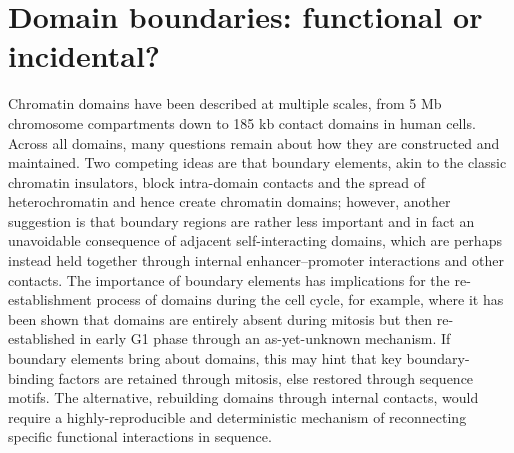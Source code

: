 \documentclass[a4paper,11pt,oneside]{book}
\begin{document}


\section{Domain boundaries: functional or incidental?}


Chromatin domains have been described at multiple scales, from 5 Mb chromosome compartments\cite{Lieberman2009} down to 185 kb contact domains\cite{Rao2014} in human cells. Across all domains, many questions remain about how they are constructed and maintained. Two competing ideas are that boundary elements, akin to the classic chromatin insulators, block intra-domain contacts and the spread of heterochromatin and hence create chromatin domains; however, another suggestion is that boundary regions are rather less important and in fact an unavoidable consequence of adjacent self-interacting domains, which are perhaps instead held together through internal enhancer--promoter interactions and other contacts. The importance of boundary elements has implications for the re-establishment process of domains during the cell cycle, for example, where it has been shown that domains are entirely absent during mitosis but then re-established in early G1 phase through an as-yet-unknown mechanism.\cite{Naumova2013, Bouwman2015a} If boundary elements bring about domains, this may hint that key boundary-binding factors are retained through mitosis, else restored through sequence motifs. The alternative, rebuilding domains through internal contacts, would require a highly-reproducible and deterministic mechanism of reconnecting specific functional interactions in sequence.
\end{document}
